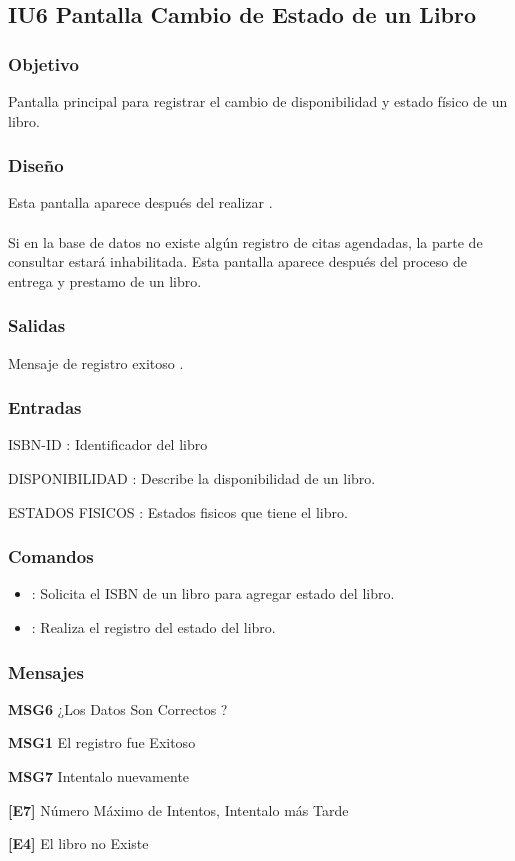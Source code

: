 \newpage
\subsection{IU6 Pantalla Cambio de Estado de un Libro}

\subsubsection{Objetivo}
	Pantalla principal para registrar el cambio de disponibilidad y estado físico de un libro.


\subsubsection{Diseño}
	Esta pantalla aparece después del realizar .  \\\\
	Si en la base de datos no existe algún registro de citas agendadas, la parte de consultar estará inhabilitada. 
	Esta pantalla aparece después del proceso de entrega y prestamo de un libro.


\subsubsection{Salidas}
	\begin{Citemize}
		\item Mensaje de registro exitoso . 
	\end{Citemize}
	
\subsubsection{Entradas}
	\begin{Citemize}
		\item ISBN-ID : Identificador del libro
		\item DISPONIBILIDAD : Describe la disponibilidad de un libro.
		\item ESTADOS FISICOS : Estados fisicos que tiene el libro.
	\end{Citemize}

\subsubsection{Comandos} 
\begin{itemize}
	\item {}: Solicita el ISBN de un libro para agregar estado del libro.
	\item {}: Realiza el registro del estado del libro.
\end{itemize}

\subsubsection{Mensajes}
	\begin{Citemize}
		\item {\bf  MSG6} ¿Los Datos Son Correctos ?
		\item {\bf  MSG1} El registro fue Exitoso
		\item {\bf  MSG7} Intentalo nuevamente
		\item {\bf  [E7]} Número Máximo de Intentos, Intentalo más Tarde
		 \item {\bf [E4]} El libro no Existe
	\end{Citemize}
